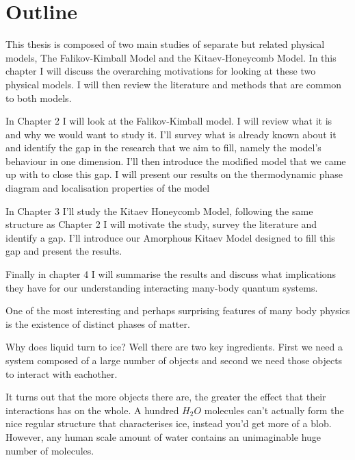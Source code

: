 \begin{Shaded}
\begin{Highlighting}[]
\OperatorTok{\%\%}
\end{Highlighting}
\end{Shaded}

\hypertarget{outline}{%
\section{Outline}\label{outline}}

This thesis is composed of two main studies of separate but related physical models, The Falikov-Kimball Model and the Kitaev-Honeycomb Model. In this chapter I will discuss the overarching motivations for looking at these two physical models. I will then review the literature and methods that are common to both models.

In Chapter 2 I will look at the Falikov-Kimball model. I will review what it is and why we would want to study it. I'll survey what is already known about it and identify the gap in the research that we aim to fill, namely the model's behaviour in one dimension. I'll then introduce the modified model that we came up with to close this gap. I will present our results on the thermodynamic phase diagram and localisation properties of the model

In Chapter 3 I'll study the Kitaev Honeycomb Model, following the same structure as Chapter 2 I will motivate the study, survey the literature and identify a gap. I'll introduce our Amorphous Kitaev Model designed to fill this gap and present the results.

Finally in chapter 4 I will summarise the results and discuss what implications they have for our understanding interacting many-body quantum systems.

One of the most interesting and perhaps surprising features of many body physics is the existence of distinct phases of matter.

Why does liquid turn to ice? Well there are two key ingredients. First we need a system composed of a large number of objects and second we need those objects to interact with eachother.

It turns out that the more objects there are, the greater the effect that their interactions has on the whole. A hundred \(H_2O\) molecules can't actually form the nice regular structure that characterises ice, instead you'd get more of a blob. However, any human scale amount of water contains an unimaginable huge number of molecules.

